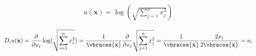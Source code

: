 \begin{solution}
\begin{align*}
    u(\textbf{x})= \log(\sqrt{\sum_{j=1}^n x_j^2})
\end{align*}

\begin{align*}
    D_i u(\textbf{x})
  = \frac{\partial}{\partial x_i} \log(\sqrt{\sum_{i=1}^n x_i^2})
  = \frac{1}{\vbraces{\textbf{x}}} \frac{\partial}{\partial x_i}
    \sqrt{\sum_{j=1}^n x_j^2}
  = \frac{1}{\vbraces{\textbf{x}}} \frac{2x_i}{2\vbraces{\textbf{x}}}
  = \nu_i
\end{align*}

\end{solution}
